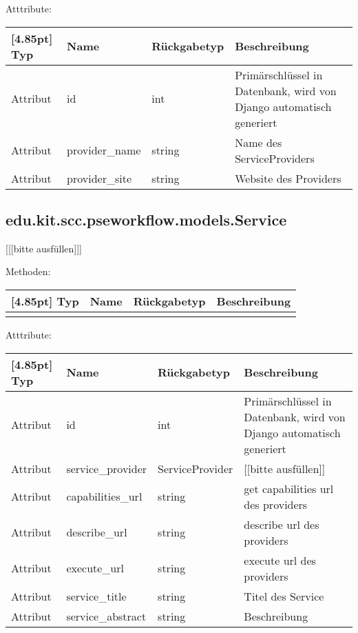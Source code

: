 			Atttribute:
			\begin{center}
				\setlength\tabcolsep{5pt}
				\renewcommand{\arraystretch}{1.5}
				
				\begin{tabularx}{\textwidth}{|l|l|l|X|}
					\hline
					\rowcolor[gray]{0.75}[4.85pt]
					Typ & Name & Rückgabetyp & Beschreibung \\ \hline 
					Attribut & id & int & Primärschlüssel in Datenbank, wird von Django automatisch generiert \\ \hline
					Attribut & provider\_name & string & Name des ServiceProviders \\ \hline
					Attribut & provider\_site & string & Website des Providers \\
					\hline
				\end{tabularx}
			\end{center}
		
		\subsection{edu.kit.scc.pseworkflow.models.Service}
			[[[bitte ausfüllen]]]
			
			Methoden:
			\begin{center}
				\setlength\tabcolsep{5pt}
				\renewcommand{\arraystretch}{1.5}
				
				\begin{tabularx}{\textwidth}{|l|l|l|X|}
					\hline
					\rowcolor[gray]{0.75}[4.85pt]
					Typ & Name & Rückgabetyp & Beschreibung \\ \hline 
					&&& \\
					\hline
				\end{tabularx}
			\end{center}
			
			Atttribute:
			\begin{center}
				\setlength\tabcolsep{5pt}
				\renewcommand{\arraystretch}{1.5}
				
				\begin{tabularx}{\textwidth}{|l|l|l|X|}
					\hline
					\rowcolor[gray]{0.75}[4.85pt]
					Typ & Name & Rückgabetyp & Beschreibung \\ \hline 
					Attribut & id & int & Primärschlüssel in Datenbank, wird von Django automatisch generiert \\ \hline
					Attribut & service\_provider & ServiceProvider & [[bitte ausfüllen]] \\ \hline
					Attribut & capabilities\_url & string & get capabilities url des providers \\ \hline
					Attribut & describe\_url & string & describe url des providers \\ \hline
					Attribut & execute\_url & string & execute url des providers \\ \hline
					Attribut & service\_title & string & Titel des Service \\ \hline
					Attribut & service\_abstract & string & Beschreibung \\
					\hline
				\end{tabularx}
			\end{center}
		
